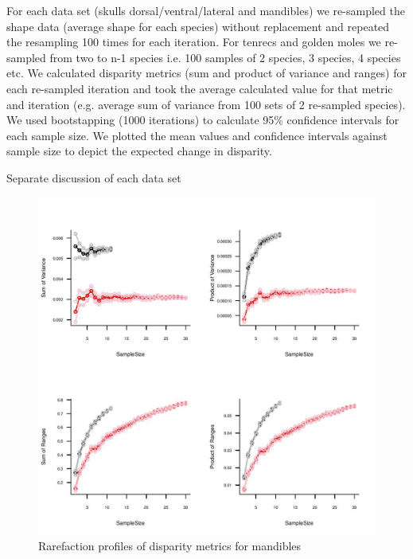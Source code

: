 \documentclass[12pt,a4paper]{article}
\begin{document}
For each data set (skulls dorsal/ventral/lateral and mandibles) we re-sampled the shape data (average shape for each species) without replacement and repeated the resampling 100 times for each iteration. For tenrecs and golden moles we re-sampled from two to n-1 species i.e. 100 samples of 2 species, 3 species, 4 species etc. We calculated disparity metrics (sum and product of variance and ranges) for each re-sampled iteration and took the average calculated value for that metric and iteration (e.g. average sum of variance from 100 sets of 2 re-sampled species). We used bootstapping (1000 iterations) to calculate 95\% confidence intervals for each sample size. We plotted the mean values and confidence intervals against sample size to depict the expected change in disparity. 

Separate discussion of each data set

\begin{figure}[H] 
  \centering
  \includegraphics{figures/mands_trc+gmole_PCrarefaction.jpg}
    \caption
    {Rarefaction profiles of disparity metrics for mandibles}%
  \label{fig:mands.rarefaction}
  \end{figure}
\end{document}
